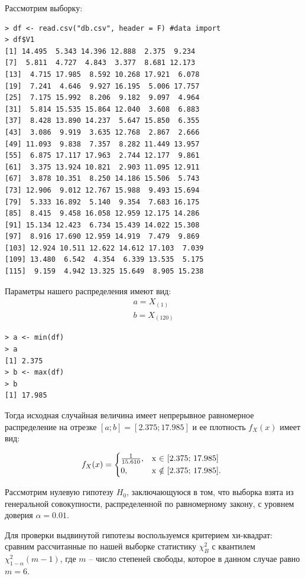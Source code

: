 \documentclass[14pt,a4paper]{scrartcl}
\begin{document}
Рассмотрим выборку:
\begin{verbatim}
> df <- read.csv("db.csv", header = F) #data import
> df$V1
[1] 14.495  5.343 14.396 12.888  2.375  9.234
[7]  5.811  4.727  4.843  3.377  8.681 12.173
[13]  4.715 17.985  8.592 10.268 17.921  6.078
[19]  7.241  4.646  9.927 16.195  5.006 17.757
[25]  7.175 15.992  8.206  9.182  9.097  4.964
[31]  5.814 15.535 15.864 12.040  3.608  6.883
[37]  8.428 13.890 14.237  5.647 15.850  6.355
[43]  3.086  9.919  3.635 12.768  2.867  2.666
[49] 11.093  9.838  7.357  8.282 11.449 13.957
[55]  6.875 17.117 17.963  2.744 12.177  9.861
[61]  3.375 13.924 10.821  2.903 11.095 12.911
[67]  3.878 10.351  8.250 14.186 15.506  5.743
[73] 12.906  9.012 12.767 15.988  9.493 15.694
[79]  5.333 16.892  5.140  9.354  7.683 16.175
[85]  8.415  9.458 16.058 12.959 12.175 14.286
[91] 15.134 12.423  6.734 15.439 14.022 15.308
[97]  8.916 17.690 12.959 14.919  7.479  9.869
[103] 12.924 10.511 12.622 14.612 17.103  7.039
[109] 13.480  6.542  4.354  6.339 13.535  5.175
[115]  9.159  4.942 13.325 15.649  8.905 15.238
\end{verbatim}


Параметры нашего распределения имеют вид:
\begin{align*}
	a = X_{(1)}\\
	b = X_{(120)}
\end{align*}

\begin{verbatim}
> a <- min(df)
> a
[1] 2.375
> b <- max(df)
> b
[1] 17.985
\end{verbatim}

Тогда исходная случайная величина имеет непрерывное равномерное распределение на отрезке $[a;b] = [2.375; 17.985]$ и ее плотность $f_X(x)$ имеет вид:

\begin{equation*}
f_X(x) = 
\begin{cases*}
\frac{1}{15.610}, & x $\in$ [2.375; 17.985]  \\
0, & x $\notin$ [2.375; 17.985]. \\
\end{cases*}
\end{equation*}


Рассмотрим нулевую гипотезу $H_0$, заключающуюся в том, что выборка взята из генеральной совокупности, распределенной по равномерному закону, с уровнем доверия $\alpha = 0.01$.


Для проверки выдвинутой гипотезы воспользуемся критерием хи-квадрат: сравним рассчитанные по нашей выборке статистику $\chi^2_B$ с квантилем ${\chi^2_{1-\alpha} (m-1)}$, где $m$ -- число степеней свободы, которое в данном случае равно $m=6$.
\end{document}

